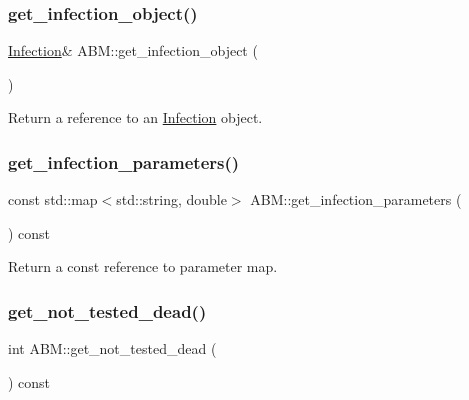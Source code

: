 \mbox{\label{classABM_a8857eef9de00abd42ce805befd03d3f0}} 
\subsubsection{\texorpdfstring{get\+\_\+infection\+\_\+object()}{get\_infection\_object()}}
{\footnotesize\ttfamily \hyperlink{classInfection}{Infection}\& A\+B\+M\+::get\+\_\+infection\+\_\+object (\begin{DoxyParamCaption}{ }\end{DoxyParamCaption})\hspace{0.3cm}{\ttfamily [inline]}}



Return a reference to an \hyperlink{classInfection}{Infection} object. 

\mbox{\label{classABM_a9d47abd943b465dfbcd0d5502cadc125}} 
\subsubsection{\texorpdfstring{get\+\_\+infection\+\_\+parameters()}{get\_infection\_parameters()}}
{\footnotesize\ttfamily const std\+::map$<$std\+::string, double$>$ A\+B\+M\+::get\+\_\+infection\+\_\+parameters (\begin{DoxyParamCaption}{ }\end{DoxyParamCaption}) const\hspace{0.3cm}{\ttfamily [inline]}}



Return a const reference to parameter map. 

\mbox{\label{classABM_a0de2ff0011fffdfdd78c7a3fa7bdda8e}} 
\subsubsection{\texorpdfstring{get\+\_\+not\+\_\+tested\+\_\+dead()}{get\_not\_tested\_dead()}}
{\footnotesize\ttfamily int A\+B\+M\+::get\+\_\+not\+\_\+tested\+\_\+dead (\begin{DoxyParamCaption}{ }\end{DoxyParamCaption}) const\hspace{0.3cm}{\ttfamily [inline]}}



